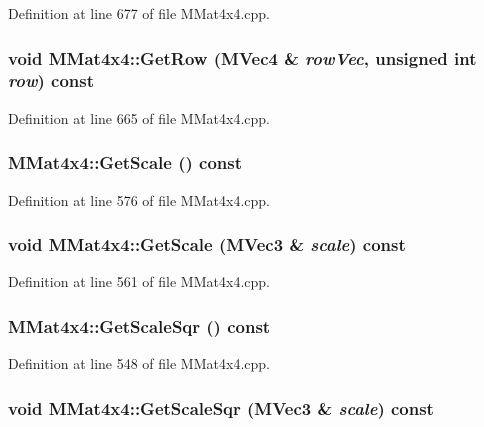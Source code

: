 Definition at line 677 of file MMat4x4.cpp.\hypertarget{class_m_mat4x4_820fe272baaa1085f2e352511efa8b29}{
\subsubsection[{GetRow}]{\setlength{\rightskip}{0pt plus 5cm}void MMat4x4::GetRow ({\bf MVec4} \& {\em rowVec}, \/  unsigned int {\em row}) const}}
\label{class_m_mat4x4_820fe272baaa1085f2e352511efa8b29}




Definition at line 665 of file MMat4x4.cpp.\hypertarget{class_m_mat4x4_55463466396ea91ce4bfe79bc6bcf110}{
\subsubsection[{GetScale}]{ MMat4x4::GetScale () const}}
\label{class_m_mat4x4_55463466396ea91ce4bfe79bc6bcf110}




Definition at line 576 of file MMat4x4.cpp.\hypertarget{class_m_mat4x4_0315b1a9ce8d06fc297b987a4e7120e4}{
\subsubsection[{GetScale}]{\setlength{\rightskip}{0pt plus 5cm}void MMat4x4::GetScale ({\bf MVec3} \& {\em scale}) const}}
\label{class_m_mat4x4_0315b1a9ce8d06fc297b987a4e7120e4}




Definition at line 561 of file MMat4x4.cpp.\hypertarget{class_m_mat4x4_a58b7792fc25fc7ca9e0822fc7da759f}{
\subsubsection[{GetScaleSqr}]{ MMat4x4::GetScaleSqr () const}}
\label{class_m_mat4x4_a58b7792fc25fc7ca9e0822fc7da759f}




Definition at line 548 of file MMat4x4.cpp.\hypertarget{class_m_mat4x4_1052ad082fcdb2973cf72e661f243834}{
\subsubsection[{GetScaleSqr}]{\setlength{\rightskip}{0pt plus 5cm}void MMat4x4::GetScaleSqr ({\bf MVec3} \& {\em scale}) const}}
\label{class_m_mat4x4_1052ad082fcdb2973cf72e661f243834}




